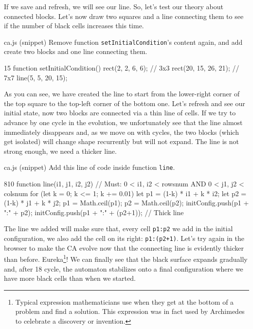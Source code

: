 If we save and refresh, we will see our line.
So, let's test our theory about connected blocks. Let's now draw two squares and a line connecting
them to see if the number of black cells increases this time.

\begin{programcode}{ca.js (snippet)}
Remove function \texttt{setInitialCondition}'s content again, and add create two blocks and one
line connecting them.
\begin{codeh1}{1}{5}
function setInitialCondition() {
  rect(2, 2, 6, 6); // 3x3
  rect(20, 15, 26, 21); // 7x7
  line(5, 5, 20, 15);
}
\end{codeh1}
\end{programcode}

As you can see, we have created the line to start from the lower-right corner of the top square to
the top-left corner of the bottom one. Let's refresh and see our initial state, now two blocks
are connected via a thin line of cells. If we try to advance by one cycle in the evolution, we
unfortunately see that the line almost immediately disappears and, as we move on with cycles,
the two blocks (which get isolated) will change shape recurrently but will not expand. The line
is not strong enough, we need a thicker line.

\begin{programcode}{ca.js (snippet)}
Add this line of code inside function \texttt{line}.
\begin{codeh1}{8}{10}
function line(i1, j1, i2, j2) {
  // Must: 0 < i1, i2 < rowsnum AND 0 < j1, j2 < colsnum
  for (let k = 0; k <= 1; k += 0.01) {
    let p1 = (1-k) * i1 + k * i2;
    let p2 = (1-k) * j1 + k * j2;
    p1 = Math.ceil(p1);
    p2 = Math.ceil(p2);
    initConfig.push(p1 + ":" + p2);
    initConfig.push(p1 + ":" + (p2+1)); // Thick line
  }
}
\end{codeh1}
\end{programcode}

The line we added will make sure that, every cell \texttt{p1:p2}
we add in the initial configuration, we also add
the cell on its right: \texttt{p1:(p2+1)}. Let's try again in the browser to make the CA evolve
now that the connecting line is evidently thicker than before.
Eureka\footnote{Typical expression mathematicians use when they get at the bottom of
a problem and find a solution. This expression was in fact used by Archimedes
to celebrate a discovery or invention.}! We can finally see that the black surface expands
gradually and, after 18 cycle, the automaton stabilizes onto a final configuration where we have
more black cells than when we started.

